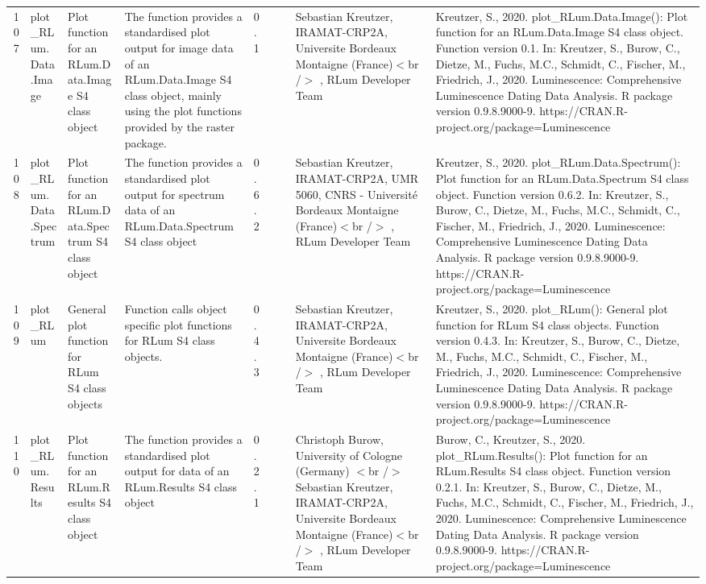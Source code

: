 \begin{table}[ht]
\begin{tabular}{rllllllll}
 \\ 
  107 & plot\_RLum.Data.Image & Plot function for an  RLum.Data.Image  S4 class object & The function provides a standardised plot output for image data of an RLum.Data.Image S4 class object, mainly using the plot functions provided by the  raster  package. & 0.1
 &  &  & Sebastian Kreutzer, IRAMAT-CRP2A, Universite Bordeaux Montaigne (France)$<$br /$>$ , RLum Developer Team & Kreutzer, S., 2020. plot\_RLum.Data.Image(): Plot function for an RLum.Data.Image S4 class object. Function version 0.1. In: Kreutzer, S., Burow, C., Dietze, M., Fuchs, M.C., Schmidt, C., Fischer, M., Friedrich, J., 2020. Luminescence: Comprehensive Luminescence Dating Data Analysis. R package version 0.9.8.9000-9. https://CRAN.R-project.org/package=Luminescence
 \\ 
  108 & plot\_RLum.Data.Spectrum & Plot function for an RLum.Data.Spectrum S4 class object & The function provides a standardised plot output for spectrum data of an RLum.Data.Spectrum S4 class object & 0.6.2
 &  &  & Sebastian Kreutzer, IRAMAT-CRP2A, UMR 5060, CNRS - Université Bordeaux Montaigne (France)$<$br /$>$ , RLum Developer Team & Kreutzer, S., 2020. plot\_RLum.Data.Spectrum(): Plot function for an RLum.Data.Spectrum S4 class object. Function version 0.6.2. In: Kreutzer, S., Burow, C., Dietze, M., Fuchs, M.C., Schmidt, C., Fischer, M., Friedrich, J., 2020. Luminescence: Comprehensive Luminescence Dating Data Analysis. R package version 0.9.8.9000-9. https://CRAN.R-project.org/package=Luminescence
 \\ 
  109 & plot\_RLum & General plot function for RLum S4 class objects & Function calls object specific plot functions for RLum S4 class objects. & 0.4.3
 &  &  & Sebastian Kreutzer, IRAMAT-CRP2A, Universite Bordeaux Montaigne (France)$<$br /$>$ , RLum Developer Team & Kreutzer, S., 2020. plot\_RLum(): General plot function for RLum S4 class objects. Function version 0.4.3. In: Kreutzer, S., Burow, C., Dietze, M., Fuchs, M.C., Schmidt, C., Fischer, M., Friedrich, J., 2020. Luminescence: Comprehensive Luminescence Dating Data Analysis. R package version 0.9.8.9000-9. https://CRAN.R-project.org/package=Luminescence
 \\ 
  110 & plot\_RLum.Results & Plot function for an RLum.Results S4 class object & The function provides a standardised plot output for data of an RLum.Results S4 class object & 0.2.1
 &  &  & Christoph Burow, University of Cologne (Germany)  $<$br /$>$ Sebastian Kreutzer, IRAMAT-CRP2A, Universite Bordeaux Montaigne (France)$<$br /$>$ , RLum Developer Team & Burow, C., Kreutzer, S., 2020. plot\_RLum.Results(): Plot function for an RLum.Results S4 class object. Function version 0.2.1. In: Kreutzer, S., Burow, C., Dietze, M., Fuchs, M.C., Schmidt, C., Fischer, M., Friedrich, J., 2020. Luminescence: Comprehensive Luminescence Dating Data Analysis. R package version 0.9.8.9000-9. https://CRAN.R-project.org/package=Luminescence

\end{tabular}
\end{table}
